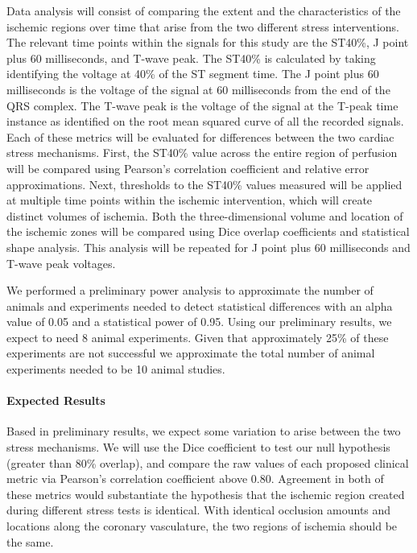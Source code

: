 Data analysis will consist of comparing the extent and the characteristics of the ischemic regions over time that arise from the two different stress interventions. The relevant time points within the signals for this study are the ST40\%, J point plus 60 milliseconds, and T-wave peak. The ST40\% is calculated by taking identifying the voltage at 40\% of the ST segment time. The J point plus 60 milliseconds is the voltage of the signal at 60 milliseconds from the end of the QRS complex. The T-wave peak is the voltage of the signal at the T-peak time instance as identified on the root mean squared curve of all the recorded signals. Each of these metrics will be evaluated for differences between the two cardiac stress mechanisms. First, the ST40\% value across the entire region of perfusion will be compared using Pearson's correlation coefficient and relative error approximations. Next, thresholds to the ST40\% values measured will be applied at multiple time points within the ischemic intervention, which will create distinct volumes of ischemia. Both the three-dimensional volume and location of the ischemic zones will be compared using Dice overlap coefficients and statistical shape analysis. This analysis will be repeated for J point plus 60 milliseconds and T-wave peak voltages. 

We performed a preliminary power analysis to approximate the number of animals and experiments needed to detect statistical differences with an alpha value of 0.05 and a statistical power of 0.95. Using our preliminary results, we expect to need 8 animal experiments. Given that approximately 25\% of these experiments are not successful we approximate the total number of animal experiments needed to be 10 animal studies. 

\paragraph{Expected Results} Based in preliminary results, we expect some
variation to arise between the two stress mechanisms.  We will use the Dice
coefficient to test our null hypothesis (greater than 80\% overlap), and
compare the raw values of each proposed clinical metric via Pearson's correlation
coefficient above 0.80. Agreement in both of these metrics would
substantiate the hypothesis that the ischemic region created during
different stress tests is identical. With identical occlusion amounts and
locations along the coronary vasculature, the two regions of ischemia
should be the same. 

